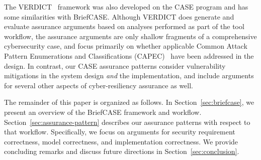 The VERDICT~\cite{verdict} framework was also developed on the CASE program and has some similarities with BriefCASE.  Although VERDICT does generate and evaluate assurance arguments based on analyses performed as part of the tool workflow, the assurance arguments are only shallow fragments of a comprehensive cybersecurity case, and focus primarily on whether applicable Common Attack Pattern Enumerations and Classifications (CAPEC)~\cite{capec} have been addressed in the design.  In contrast, our CASE assurance patterns consider vulnerability mitigations in the system design \textit{and} the implementation, and include arguments for several other aspects of cyber-resiliency assurance as well.

The remainder of this paper is organized as follows. In Section~\ref{sec:briefcase}, we present an overview of the BriefCASE framework and workflow. Section~\ref{sec:assurance-pattern} describes our assurance patterns with respect to that workflow. Specifically, we focus on arguments for security requirement correctness, model correctness, and implementation correctness.  We provide concluding remarks and discuss future directions in Section~\ref{sec:conclusion}.